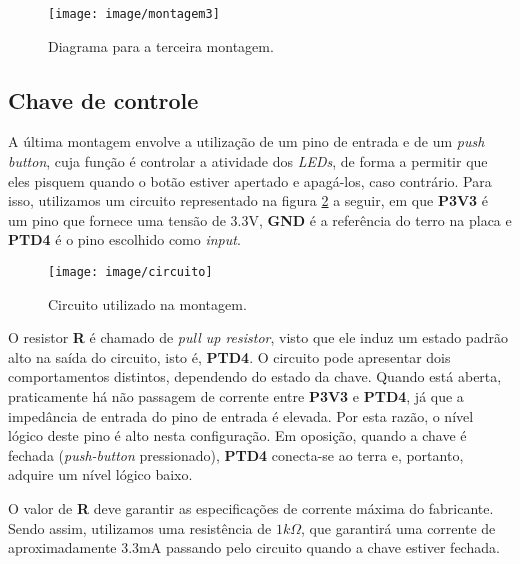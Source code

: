 \FloatBarrier

\begin{figure}[h]
    \centering
    \texttt{[image: image/montagem3]}
    
    \caption{Diagrama para a terceira montagem.}
    \label{fig:m3}
\end{figure} 

\FloatBarrier

\subsection{Chave de controle}

A última montagem envolve a utilização de um pino de entrada e de um
\textit{push button}, cuja função é controlar a atividade dos \textit{LEDs}, de
forma a permitir que eles pisquem quando o botão estiver apertado e apagá-los,
caso contrário. Para isso, utilizamos um circuito representado na figura
\ref{fig:circ} a seguir, em que \textbf{P3V3} é um pino que fornece uma tensão
de 3.3V, \textbf{GND} é a referência do terro na placa e \textbf{PTD4} é o pino
escolhido como \textit{input}.

\begin{figure}[h]
    \centering
    \texttt{[image: image/circuito]}
    
    \caption{Circuito utilizado na montagem.}
    \label{fig:circ}
\end{figure} 

O resistor \textbf{R} é chamado de \textit{pull up resistor}, visto que ele
induz um estado padrão alto na saída do circuito, isto é, \textbf{PTD4}. O
circuito pode apresentar dois comportamentos distintos, dependendo do
estado da chave. Quando está aberta, praticamente há não passagem de
corrente entre \textbf{P3V3} e \textbf{PTD4}, já que a impedância de entrada do
pino de entrada é elevada. Por esta razão, o nível lógico deste
pino é alto nesta configuração. Em oposição, quando a chave é fechada
(\textit{push-button} pressionado), \textbf{PTD4} conecta-se ao terra e,
portanto, adquire um nível lógico baixo.

\vspace{12pt}

O valor de \textbf{R} deve garantir as especificações de corrente máxima do
fabricante. Sendo assim, utilizamos uma resistência de \(1k\Omega\), que
garantirá uma corrente de aproximadamente 3.3mA passando pelo circuito quando a
chave estiver fechada.

\vspace{12pt}

